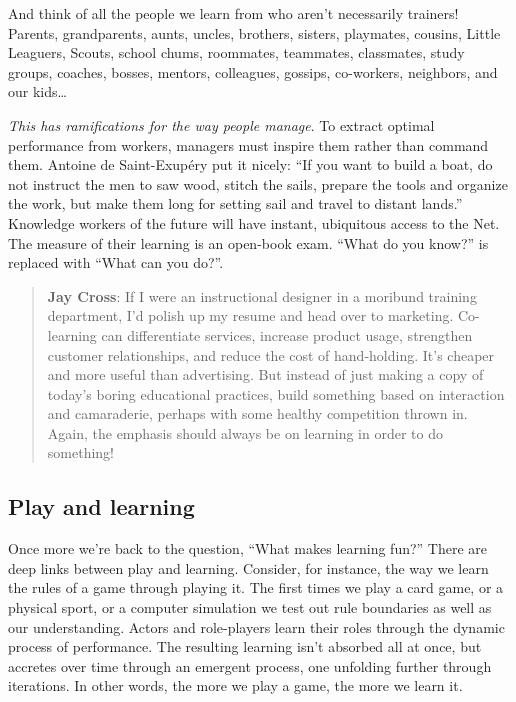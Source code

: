 And think of all the people we learn from who aren't necessarily
trainers! Parents, grandparents, aunts, uncles, brothers, sisters,
playmates, cousins, Little Leaguers, Scouts, school chums, roommates,
teammates, classmates, study groups, coaches, bosses, mentors,
colleagues, gossips, co-workers, neighbors, and our kids\ldots{}

\emph{This has ramifications for the way people manage}. To extract
optimal performance from workers, managers must inspire them rather than
command them. Antoine de Saint-Exupéry put it nicely: ``If you want to
build a boat, do not instruct the men to saw wood, stitch the sails,
prepare the tools and organize the work, but make them long for setting
sail and travel to distant lands.'' Knowledge workers of the future will
have instant, ubiquitous access to the Net. The measure of their
learning is an open-book exam. ``What do you know?'' is replaced with
``What can you do?''.

\begin{quote}
\textbf{Jay Cross}: If I were an instructional designer in a moribund
training department, I'd polish up my resume and head over to marketing.
Co-learning can differentiate services, increase product usage,
strengthen customer relationships, and reduce the cost of hand-holding.
It's cheaper and more useful than advertising. But instead of just
making a copy of today's boring educational practices, build something
based on interaction and camaraderie, perhaps with some healthy
competition thrown in. Again, the emphasis should always be on learning
in order to do something!
\end{quote}

\subsection{Play and learning}

Once more we're back to the question, ``What makes learning fun?'' There
are deep links between play and learning. Consider, for instance, the
way we learn the rules of a game through playing it. The first times we
play a card game, or a physical sport, or a computer simulation we test
out rule boundaries as well as our understanding. Actors and
role-players learn their roles through the dynamic process of
performance. The resulting learning isn't absorbed all at once, but
accretes over time through an emergent process, one unfolding further
through iterations. In other words, the more we play a game, the more we
learn it.

